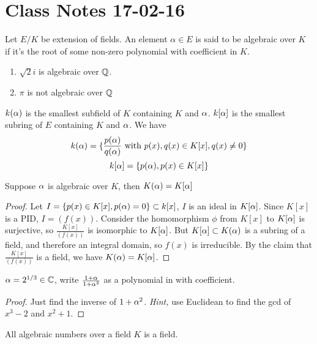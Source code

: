 \section{Class Notes 17-02-16}
\begin{definition}
Let $E/K$ be extension of fields. An element $\alpha\in E$ is said to be algebraic over $K$ if it's the root of some non-zero polynomial with coefficient in $K$.
\end{definition}
\begin{example}\mbox{}
\begin{enumerate}
	\item
	$\sqrt{2}i$ is algebraic over $\mathbb{Q}$.
	\item
	$\pi$ is not algebraic over $\mathbb{Q}$
\end{enumerate}
\end{example}
$k(\alpha)$ is the smallest subfield of $K$ containing $K$ and $\alpha$. $k[\alpha]$ is the smallest subring of $E$ containing $K$ and $\alpha$. We have
$$
k(\alpha)=\{\frac{p(\alpha)}{q(\alpha)} \mbox{ with } p(x),q(x)\in K[x], q(x)\ne0 \}
$$
$$
k[\alpha]=\{{p(\alpha)}, p(x)\in K[x]\}
$$
\begin{theorem}
Suppose $\alpha$ is algebraic over $K$, then $K(\alpha)=K[\alpha]$
\end{theorem}
\begin{proof}
Let $I=\{p(x)\in K[x], p(\alpha)=0 \}\subset k[x]$, $I$ is an ideal in $K[\alpha]$. Since $K[x]$ is a PID, $I = (f(x))$. Consider the homomorphism $\phi$ from $K[x]$ to $K[\alpha]$ is surjective, so $\frac{K[x]}{(f(x))}$ is isomorphic to $K[\alpha]$. But $K[\alpha]\subset K(\alpha)$ is a subring of a field, and therefore an integral domain, so $f(x)$ is irreducible. By the claim that $\frac{K[x]}{(f(x))}$ is a field, we have $K(\alpha)=K[\alpha]$. 
\end{proof}
\begin{exercise}
$\alpha=2^{1/3}\in\mathbb{C}$, write $\frac{1+\alpha}{1+\alpha^2}$ as a polynomial in \al with \Q coefficient.
\end{exercise}
\begin{proof}
Just find the inverse of $1+\alpha^2$. \emph{Hint,} use Euclidean to find the gcd of $x^3-2$ and $x^2+1$.
\end{proof}
\begin{theorem}
All algebraic numbers over a field $K$ is a field.
\end{theorem}
